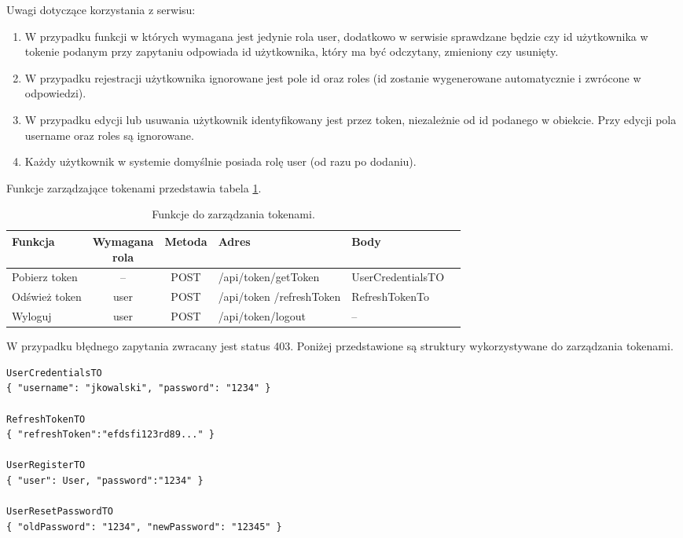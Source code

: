 \documentclass[11pt,a4paper,twoside]{article}
\begin{document}
Uwagi dotyczące korzystania z serwisu:
\begin{enumerate}
\item W przypadku funkcji w których wymagana jest jedynie rola user, dodatkowo w serwisie sprawdzane będzie czy id użytkownika w tokenie podanym przy zapytaniu odpowiada id użytkownika, który ma być odczytany, zmieniony czy usunięty.
\item W przypadku rejestracji użytkownika ignorowane jest pole id oraz roles (id zostanie wygenerowane automatycznie i zwrócone w odpowiedzi).
\item W przypadku edycji lub usuwania użytkownik identyfikowany jest przez token, niezależnie od id podanego w obiekcie. Przy edycji pola username oraz roles są ignorowane.
\item Każdy użytkownik w systemie domyślnie posiada rolę user (od razu po dodaniu).
\end{enumerate}

Funkcje zarządzające tokenami przedstawia tabela \ref{obslugaTokenow}.

\begin{table}[H]
\caption{Funkcje do zarządzania tokenami.}
\label{obslugaTokenow}
\centering
\begin{tabularx}{\textwidth}{|X|c|c|X|X|X|}
\hline
 Funkcja & \makecell{Wymagana \\ rola} & Metoda & Adres & Body \\\hline
 Pobierz token & -- & POST & /api/token/getToken & UserCredentialsTO \\\hline
 Odśwież token & user & POST & /api/token /refreshToken & RefreshTokenTo \\\hline
 Wyloguj & user & POST & /api/token/logout & -- \\\hline
\end{tabularx}
\end{table}

W przypadku błędnego zapytania zwracany jest status 403.
Poniżej przedstawione są struktury wykorzystywane do zarządzania tokenami.

\begin{lstlisting}
UserCredentialsTO
{ "username": "jkowalski", "password": "1234" }

RefreshTokenTO 
{ "refreshToken":"efdsfi123rd89..." }

UserRegisterTO
{ "user": User, "password":"1234" }

UserResetPasswordTO
{ "oldPassword": "1234", "newPassword": "12345" }
\end{lstlisting}
\vspace{-20pt}
\end{document}
